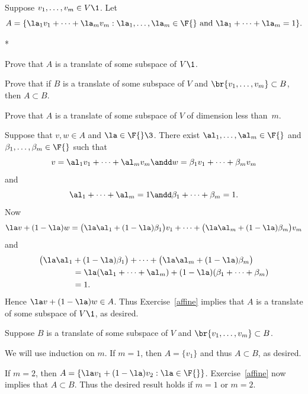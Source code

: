 \exercise
Suppose $v_1, \dots, v_m \in V\1$. Let
\[
A = \{ \la_1 v_1 + \dots + \la_m v_m : \la_1, \dots, \la_m \in \F{}\ \text{and}\ \la_1 + \dots + \la_m = 1 \}.
\]
\begin{subtheorem}*
\item
Prove that $A$ is a translate of some subspace of $V\1$.
\item
Prove that if $B$ is a translate of some subspace of $V$ and $\br{v_1, \dots, v_m} \subset B$, then $A \subset B$.
\item
Prove that $A$ is a translate of some subspace of $V$ of dimension less than~$m$.
\end{subtheorem}
\exercisesubtheoremend

\begin{Solution}
\begin{subtheorem}
\item
Suppose that $v, w \in A$ and $\la \in \F{}\3$. There exist $\al_1, \dots, \al_m \in \F{}$ and $\beta_1, \dots, \beta_m \in \F{}$ such that
\[
v = \al_1 v_1 + \dots + \al_m v_m \andd w = \beta_1 v_1 + \dots + \beta_m v_m
\]
and
\[
\al_1 + \dots + \al_m = 1 \andd \beta_1 + \dots + \beta_m = 1.
\]
Now
\[
\la v + (1-\la)w = \bigl(\la \al_1 + (1-\la)\beta_1 \bigr) v_1 + \dots +
 \bigl(\la \al_m + (1-\la)\beta_m \bigr) v_m
\]
and
\begin{align*}
 \bigl(\la \al_1 &+ (1-\la)\beta_1 \bigr) + \dots +
 \bigl(\la \al_m + (1-\la)\beta_m \bigr) \\
 &= \la(\al_1 + \dots + \al_m) + (1-\la)(\beta_1 + \dots + \beta_m) \\
& = 1.
 \end{align*}
Hence $\la v + (1 - \la) w \in A$. Thus Exercise~\ref{affine} implies that $A$ is a translate of some subspace of $V\1$, as desired.

\item
Suppose $B$ is a translate of some subspace of $V$ and $\br{v_1, \dots, v_m} \subset B$.

We will use induction on $m$. If $m = 1$, then $A = \{v_1\}$ and thus $A \subset B$, as desired.

If $m = 2$, then $A = \{\la v_1 + (1 - \la) v_2 : \la \in \F{}\}$. Exercise~\ref{affine} now implies that $A \subset B$. Thus the desired result holds if $m = 1$ or $m = 2$.


\end{subtheorem}
\end{Solution}
